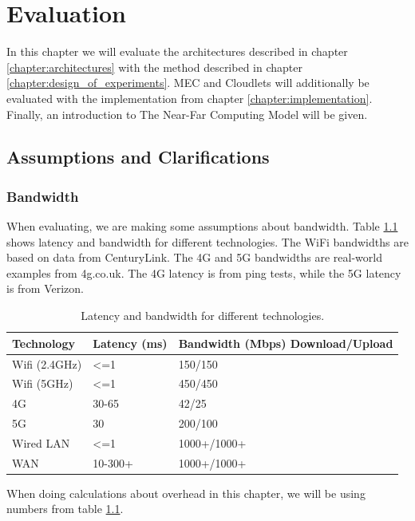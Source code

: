\chapter{Evaluation}\label{chapter:evaluation}

In this chapter we will evaluate the architectures described in chapter \ref{chapter:architectures} with the method described in chapter \ref{chapter:design_of_experiments}. MEC and Cloudlets will additionally be evaluated with the implementation from chapter \ref{chapter:implementation}. Finally, an introduction to The Near-Far Computing Model will be given.






\section{Assumptions and Clarifications}
\subsection{Bandwidth}
When evaluating, we are making some assumptions about bandwidth. Table \ref{tab:Bandwidth_latency} shows latency and bandwidth for different technologies. The WiFi bandwidths are based on data from CenturyLink\cite{noauthor_24_nodate}. The 4G and 5G bandwidths are real-world examples from 4g.co.uk\cite{noauthor_how_nodate}. The 4G latency is from ping tests, while the 5G latency is from Verizon\cite{noauthor_what_2020}.
\renewcommand{\arraystretch}{1.2}
\begin{table}[h!]
    \centering
    \begin{tabular}[c]{l|p{3cm}p{4cm}}

        Technology & Latency (ms) & Bandwidth (Mbps) Download/Upload \\
        \hline

        Wifi (2.4GHz) & <=1 & 150/150  \\

        Wifi (5GHz) & <=1 & 450/450  \\

        4G & 30-65 & 42/25  \\

        5G & 30 & 200/100  \\

        Wired LAN & <=1 & 1000+/1000+  \\

        WAN & 10-300+ & 1000+/1000+  \\

        
        
    \end{tabular}
    \caption{Latency and bandwidth for different technologies.}
    \label{tab:Bandwidth_latency}
\end{table}
When doing calculations about overhead in this chapter, we will be using numbers from table \ref{tab:Bandwidth_latency}.





